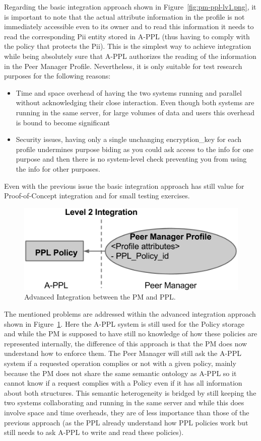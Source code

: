 Regarding the basic integration approach shown in Figure~\ref{fig:pm-ppl-lv1.png}, it is important to note that the actual attribute information in the profile is not immediately accessible even to its owner and to read this information it needs to read the corresponding Pii entity stored in A-PPL (thus having to comply with the policy that protects the Pii). This is the simplest way to achieve integration while being absolutely sure that A-PPL authorizes the reading of the information in the Peer Manager Profile. Nevertheless, it is only suitable for test research purposes for the following reasons:
\begin{itemize}
	\item Time and space overhead of having the two systems running and parallel without acknowledging their close interaction. Even though both systems are running in the same server, for large volumes of data and users this overhead is bound to become significant
	\item Security issues, having only a single unchanging encryption\_key for each profile undermines purpose biding as you could ask access to the info for one purpose and then there is no system-level check preventing you from using the info for other purposes.
\end{itemize}

Even with the previous issue the basic integration approach has still value for Proof-of-Concept integration and for small testing exercises. 

\begin{figure}[htb!]
\centering
\includegraphics[width=0.6\linewidth]{figures/pm-ppl-lv2.png}
\caption{Advanced Integration between the PM and PPL.}
\label{fig:pm-ppl-lv2.png}
\end{figure}

The mentioned problems are addressed within the advanced integration approach shown in Figure~\ref{fig:pm-ppl-lv2.png}. Here the A-PPL system is still used for the Policy storage and while the PM is supposed to have still no knowledge of how these policies are represented internally, the difference of this approach is that the PM does now understand how to enforce them. The Peer Manager will still ask the A-PPL system if a requested operation complies or not with a given policy, mainly because the PM does not share the same semantic ontology as A-PPL so it cannot know if a request complies with a Policy even if it has all information about both structures. This semantic heterogeneity is bridged by still keeping the two systems collaborating and running in the same server and while this does involve space and time overheads, they are of less importance than those of the previous approach (as the PPL already understand how PPL policies work but still needs to ask A-PPL to write and read these policies).

